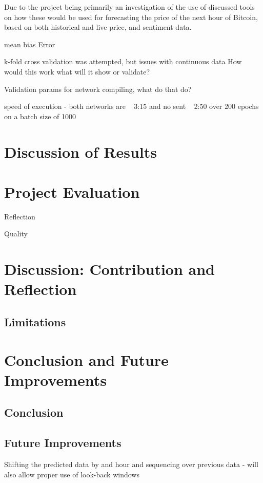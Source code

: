 \documentclass[oneside, 12pt]{article}
\begin{document}
	Due to the project being primarily an investigation of the use of discussed tools on how these would be used for forecasting the price of the next hour of Bitcoin, based on both historical and live price, and sentiment data.
	
	mean bias Error
	
	k-fold cross validation was attempted, but issues with continuous data
	How would this work what will it show or validate?
	
	Validation params for network compiling, what do that do?
	
	speed of execution - both networks are ~ 3:15 and no sent ~ 2:50 over 200 epochs on a batch size of 1000
	
	\section{Discussion of Results}
	
	\newpage
	
	\section{Project Evaluation}
	Reflection
	
	Quality
	
	
	\section{Discussion: Contribution and Reflection}
	\subsection{Limitations}
	
	
	\newpage
	
	\section{Conclusion and Future Improvements}
		\subsection{Conclusion}
		
		
		\subsection{Future Improvements}
		Shifting the predicted data by and hour and sequencing over previous data - will also allow proper use of look-back windows
		
\end{document}
